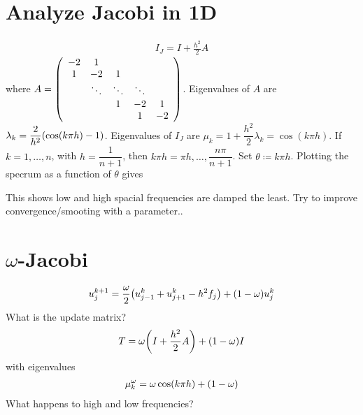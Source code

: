 \documentclass{article}
\newcommand{\tridsym}[3]{
    \qty(\begin{array}{ccccc}
                    #1 & #2 & & & \\
                    #3 & #1 & #2 & & \\
                    & \ddots & \ddots & \ddots &  \\
                    & & #3 & #1 & #2 \\
                    & & & #3 & #1
                \end{array})
}
\begin{document}
    \section{Analyze Jacobi in 1D}
        \begin{align}
            I_J = I + \frac{h^2}{2}A
        \end{align}
        where $A = \tridsym{-2}{1}{1}$.  Eigenvalues of $A$ are $\lambda_k = \dfrac{2}{h^2}\qty(\cos(k\pi h) - 1)$.  Eigenvalues of $I_J$ are $\mu_k = 1 + \dfrac{h^2}{2}\lambda_k = \cos(k\pi h)$.  If $k = 1,\dots,n$, with $h = \dfrac{1}{n+1}$, then $k\pi h = \pi h,\dots,\dfrac{n\pi}{n+1}$.  Set $\theta\coloneqq k\pi h$.
        Plotting the specrum as a function of $\theta$ gives
        \begin{figure}[ht!]
            \centering
        \end{figure}
        \FloatBarrier
        This shows low and high spacial frequencies are damped the least.  Try to improve convergence/smooting with a parameter..

    \section{$\omega$-Jacobi}
        \begin{align}
            u_j^{k+1} = \frac{\omega}{2}\qty(u_{j-1}^k + u_{j+1}^k - h^2f_j) + (1 - \omega)u_j^k
        \end{align}
        What is the update matrix?
        \begin{align}
            T = \omega\qty(I + \frac{h^2}{2}{A}) + \qty(1 - \omega)I
        \end{align}
        with eigenvalues
        \begin{align}
            \mu_k^\omega = \omega\cos(k\pi h) + \qty(1 - \omega)
        \end{align}
        What happens to high and low frequencies?
\end{document}
